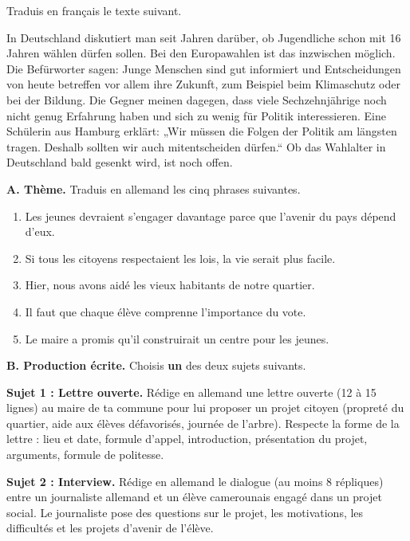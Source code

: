 \documentclass[11pt]{article}
\begin{document}
\begin{exercice}
Traduis en français le texte suivant.

\begin{textebox}[Wählen ab 16?]
In Deutschland diskutiert man seit Jahren darüber, ob Jugendliche schon mit 16 Jahren wählen dürfen sollen. Bei den Europawahlen ist das inzwischen möglich. Die Befürworter sagen: Junge Menschen sind gut informiert und Entscheidungen von heute betreffen vor allem ihre Zukunft, zum Beispiel beim Klimaschutz oder bei der Bildung. Die Gegner meinen dagegen, dass viele Sechzehnjährige noch nicht genug Erfahrung haben und sich zu wenig für Politik interessieren. Eine Schülerin aus Hamburg erklärt: „Wir müssen die Folgen der Politik am längsten tragen. Deshalb sollten wir auch mitentscheiden dürfen.“ Ob das Wahlalter in Deutschland bald gesenkt wird, ist noch offen.
\end{textebox}
\end{exercice}

\begin{exercice}
\textbf{A. Thème.} Traduis en allemand les cinq phrases suivantes.
\begin{enumerate}
\item Les jeunes devraient s'engager davantage parce que l'avenir du pays dépend d'eux.
\item Si tous les citoyens respectaient les lois, la vie serait plus facile.
\item Hier, nous avons aidé les vieux habitants de notre quartier.
\item Il faut que chaque élève comprenne l'importance du vote.
\item Le maire a promis qu'il construirait un centre pour les jeunes.
\end{enumerate}

\textbf{B. Production écrite.} Choisis \textbf{un} des deux sujets suivants.

\textbf{Sujet 1 : Lettre ouverte.} Rédige en allemand une lettre ouverte (12 à 15 lignes) au maire de ta commune pour lui proposer un projet citoyen (propreté du quartier, aide aux élèves défavorisés, journée de l'arbre). Respecte la forme de la lettre : lieu et date, formule d'appel, introduction, présentation du projet, arguments, formule de politesse.

\textbf{Sujet 2 : Interview.} Rédige en allemand le dialogue (au moins 8 répliques) entre un journaliste allemand et un élève camerounais engagé dans un projet social. Le journaliste pose des questions sur le projet, les motivations, les difficultés et les projets d'avenir de l'élève.
\end{exercice}
\end{document}
